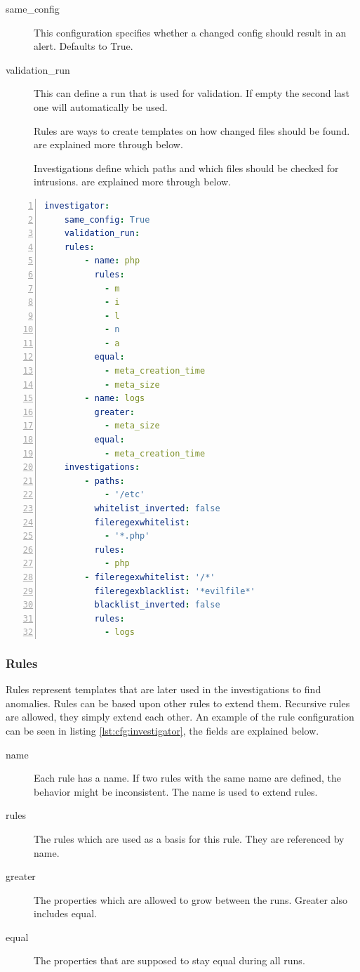 \begin{description}
    \item [same\_config] This configuration specifies whether a changed config should result in an alert. Defaults to True.
    \item [validation\_run] This can define a run that is used for validation. If empty the second last one will automatically be used.
    \item [] Rules are ways to create templates on how changed files should be found.  are explained more through below.
    \item [] Investigations define which paths and which files should be checked for intrusions.  are explained more through below.
\end{description}

\begin{lstlisting}[language=yaml, numbers=left, caption=Investigator Configuration, label=lst:cfg:investigator]
investigator:
	same_config: True
	validation_run: 
	rules: 
		- name: php
		  rules: 
			- m
			- i
			- l
			- n
			- a
		  equal:
			- meta_creation_time
			- meta_size
		- name: logs
		  greater:
			- meta_size
		  equal:
			- meta_creation_time
	investigations:
		- paths:
			- '/etc'
		  whitelist_inverted: false
		  fileregexwhitelist:
			- '*.php'
		  rules:
			- php
		- fileregexwhitelist: '/*'
		  fileregexblacklist: '*evilfile*'
		  blacklist_inverted: false
		  rules:
			- logs
\end{lstlisting}

\subsubsection{Rules}
\label{sec:config:rules}

Rules represent templates that are later used in the investigations to find anomalies. Rules can be based upon other rules to extend them. Recursive rules are allowed, they simply extend each other. An example of the rule configuration can be seen in listing \ref{lst:cfg:investigator}, the fields are explained below.

\begin{description}
	\item [name] Each rule has a name. If two rules with the same name are defined, the behavior might be inconsistent. The name is used to extend rules.
	\item [rules] The rules which are used as a basis for this rule. They are referenced by name.
	\item [greater] The properties which are allowed to grow between the runs. Greater also includes equal.
	\item [equal] The properties that are supposed to stay equal during all runs.
\end{description}

